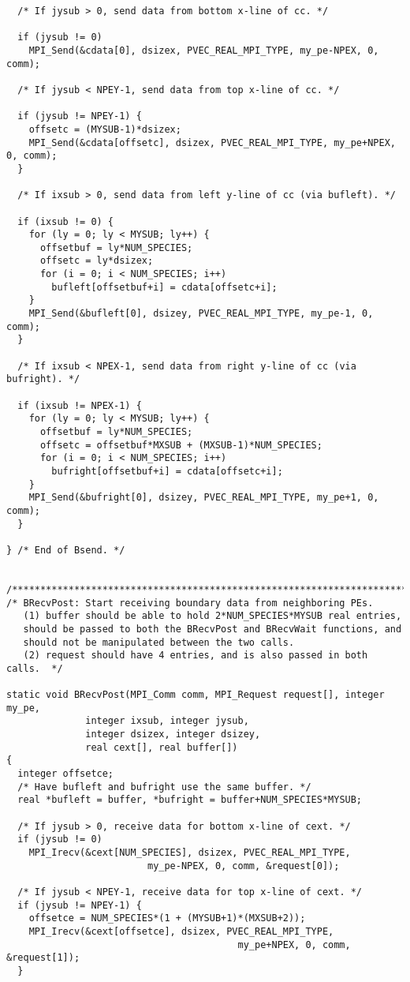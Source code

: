 \documentclass[11pt]{article}
\begin{document}
\begin{verbatim}
  /* If jysub > 0, send data from bottom x-line of cc. */

  if (jysub != 0)
    MPI_Send(&cdata[0], dsizex, PVEC_REAL_MPI_TYPE, my_pe-NPEX, 0, comm);

  /* If jysub < NPEY-1, send data from top x-line of cc. */

  if (jysub != NPEY-1) {
    offsetc = (MYSUB-1)*dsizex;
    MPI_Send(&cdata[offsetc], dsizex, PVEC_REAL_MPI_TYPE, my_pe+NPEX, 0, comm);
  }

  /* If ixsub > 0, send data from left y-line of cc (via bufleft). */

  if (ixsub != 0) {
    for (ly = 0; ly < MYSUB; ly++) {
      offsetbuf = ly*NUM_SPECIES;
      offsetc = ly*dsizex;
      for (i = 0; i < NUM_SPECIES; i++)
        bufleft[offsetbuf+i] = cdata[offsetc+i];
    }
    MPI_Send(&bufleft[0], dsizey, PVEC_REAL_MPI_TYPE, my_pe-1, 0, comm);   
  }

  /* If ixsub < NPEX-1, send data from right y-line of cc (via bufright). */

  if (ixsub != NPEX-1) {
    for (ly = 0; ly < MYSUB; ly++) {
      offsetbuf = ly*NUM_SPECIES;
      offsetc = offsetbuf*MXSUB + (MXSUB-1)*NUM_SPECIES;
      for (i = 0; i < NUM_SPECIES; i++)
        bufright[offsetbuf+i] = cdata[offsetc+i];
    }
    MPI_Send(&bufright[0], dsizey, PVEC_REAL_MPI_TYPE, my_pe+1, 0, comm);   
  }

} /* End of Bsend. */

 
/*************************************************************************/
/* BRecvPost: Start receiving boundary data from neighboring PEs.
   (1) buffer should be able to hold 2*NUM_SPECIES*MYSUB real entries,
   should be passed to both the BRecvPost and BRecvWait functions, and
   should not be manipulated between the two calls.
   (2) request should have 4 entries, and is also passed in both calls.  */

static void BRecvPost(MPI_Comm comm, MPI_Request request[], integer my_pe,
              integer ixsub, integer jysub,
              integer dsizex, integer dsizey,
              real cext[], real buffer[])
{
  integer offsetce;
  /* Have bufleft and bufright use the same buffer. */
  real *bufleft = buffer, *bufright = buffer+NUM_SPECIES*MYSUB;

  /* If jysub > 0, receive data for bottom x-line of cext. */
  if (jysub != 0)
    MPI_Irecv(&cext[NUM_SPECIES], dsizex, PVEC_REAL_MPI_TYPE,
                         my_pe-NPEX, 0, comm, &request[0]);

  /* If jysub < NPEY-1, receive data for top x-line of cext. */
  if (jysub != NPEY-1) {
    offsetce = NUM_SPECIES*(1 + (MYSUB+1)*(MXSUB+2));
    MPI_Irecv(&cext[offsetce], dsizex, PVEC_REAL_MPI_TYPE,
                                         my_pe+NPEX, 0, comm, &request[1]);
  }


\end{verbatim}
\end{document}
